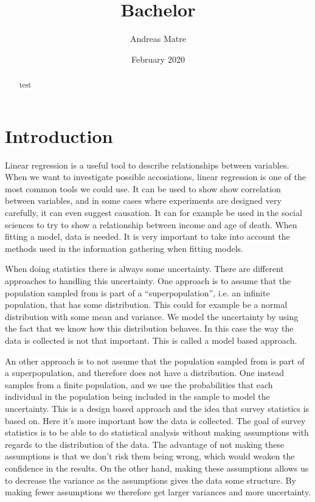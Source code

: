\documentclass{article}
\title{Bachelor}
\author{Andreas Matre}
\date{February 2020}
\begin{document}
\newtheorem{definition}{Definition}[section]
\newtheorem{theorem}{Theorem}
\newtheorem{example}{Example}[section]


\maketitle

\begin{abstract}
 test 
\end{abstract}

\tableofcontents

\section{Introduction}

Linear regression is a useful tool to describe relationships between variables.
When we want to investigate possible accosiations, linear regression
is one of the most common tools we could use. It can be used to show show correlation between
variables, and in some cases where experiments are designed very carefully, it can even suggest causation.
It can for example be used in the social sciences to try to show a relationship
between income and age of death.
When fitting a model, data is needed. It is very important to take into account the methods used in
the information gathering when fitting models.

When doing statistics there is always some uncertainty. There are different
approaches to handling this uncertainty. One approach is to assume that the population sampled from is part of a ``superpopulation'', i.e. an
infinite population, that has some distribution. This could for example be a
normal distribution with some mean and variance. We model the uncertainty by using the
fact that we know how this distribution behaves.
In this case the way the data
is collected is not that important. This is called a model based approach.


An other approach is to not assume that the population sampled from is part of a
superpopulation, and therefore does not have a distribution.
One instead samples from a finite population, and we use the probabilities that
each individual in the population being included in the sample to model the uncertainty.
This is a design based approach and the idea that survey statistics is based on. Here it's more important how
the data is collected.
The goal of survey statistics is to be able to do statistical analysis without
making assumptions with regards to the distribution of the data. The advantage
of not making these assumptions is that we don't risk them being wrong, which
would weaken the confidence in the results. On the other hand,
making these assumptions allows us to decrease the variance as the assumptions
gives the data some structure. By making fewer assumptions we
therefore get larger variances and more uncertainty.
\end{document}
